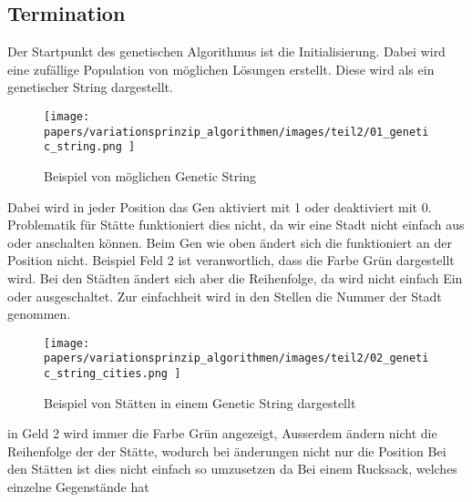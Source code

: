 %
%
%
%
\subsection{Termination
\label{genetic_algorithm:termination}}
Der Startpunkt des genetischen Algorithmus ist die Initialisierung.
Dabei wird eine zufällige Population von möglichen Lösungen erstellt.
Diese wird als ein genetischer String dargestellt.

\begin{figure} [h]
	\centering
	\texttt{[image: 
        papers/variationsprinzip\_algorithmen/images/teil2/01\_genetic\_string.png
        ]}
	\caption{Beispiel von möglichen Genetic String}
	\label{fig:possible_genetic_string}
\end{figure}

Dabei wird in jeder Position das Gen aktiviert mit 1 oder deaktiviert mit 0.
Problematik für Stätte funktioniert dies nicht, da wir eine Stadt nicht
einfach aus oder anschalten können. Beim Gen wie oben ändert sich die funktioniert
an der Position nicht. Beispiel Feld 2 ist veranwortlich, dass die Farbe Grün
dargestellt wird. Bei den Städten ändert sich aber die Reihenfolge, da wird 
nicht einfach Ein oder ausgeschaltet. Zur einfachheit wird in den Stellen 
die Nummer der Stadt genommen.

\begin{figure} [h]
	\centering
	\texttt{[image: 
        papers/variationsprinzip\_algorithmen/images/teil2/02\_genetic\_string\_cities.png
        ]}
	\caption{Beispiel von Stätten in einem Genetic String dargestellt}
	\label{fig:cities_genetic_string}
\end{figure}


in Geld 2 wird immer die Farbe Grün angezeigt,  Ausserdem ändern nicht die Reihenfolge
der der Stätte, wodurch bei änderungen nicht nur die Position 
Bei den Stätten ist dies nicht einfach so umzusetzen da Bei einem Rucksack, welches einzelne Gegenstände hat 


